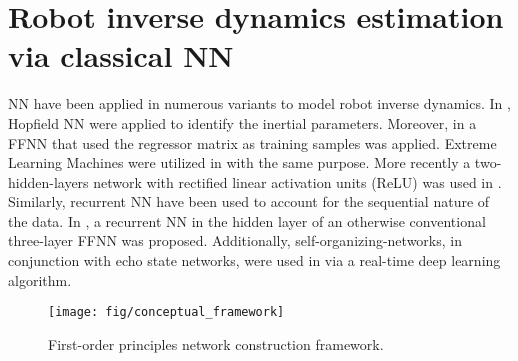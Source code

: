 \section{Robot inverse dynamics estimation via classical NN}\label{sec:classic_inv_dyn}
NN have been applied in numerous variants to model robot inverse dynamics. In \cite{AtenciaJoy2015}, Hopfield NN were applied to identify the inertial parameters. Moreover, in \cite{ZhuMao2014} a FFNN that used the regressor matrix as training samples was applied. Extreme Learning Machines were utilized in \cite{BargstenGeaKas2016} with the same purpose. More recently a two-hidden-layers network with rectified linear activation units (ReLU) was used in \cite{ChristianoShaMorSch2016}. Similarly, recurrent NN have been used to account for the sequential nature of the data. In \cite{YanLi1997}, a recurrent NN in the hidden layer of an otherwise conventional three-layer FFNN was proposed. Additionally, self-organizing-networks, in conjunction with echo state networks, were used in \cite{PolydorosNalKru2015} via a real-time deep learning algorithm.
\begin{figure}[ht]
\begin{center}
    \texttt{[image: fig/conceptual\_framework]} 
    \caption{First-order principles network construction framework.}
    \label{fig:general_overview}
\end{center}
\end{figure}

